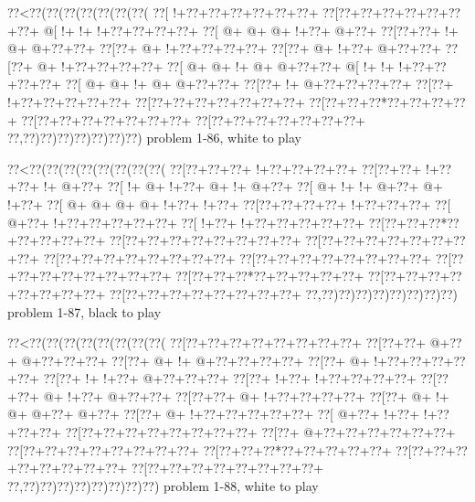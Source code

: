 \vbox{\vbox{\goo
\0??<\0??(\0??(\0??(\0??(\0??(\0??(\0??(
\0??[\- !+\0??+\0??+\0??+\0??+\0??+\0??+
\0??[\0??+\0??+\0??+\0??+\0??+\0??+\0??+
\- @[\- !+\- !+\- !+\0??+\0??+\0??+\0??+
\0??[\- @+\- @+\- @+\- !+\0??+\- @+\0??+
\0??[\0??+\0??+\- !+\- @+\- @+\0??+\0??+
\0??[\0??+\- @+\- !+\0??+\0??+\0??+\0??+
\0??[\0??+\- @+\- !+\0??+\- @+\0??+\0??+
\0??[\0??+\- @+\- !+\0??+\0??+\0??+\0??+
\0??[\- @+\- @+\- !+\- @+\- @+\0??+\0??+
\- @[\- !+\- !+\- !+\0??+\0??+\0??+\0??+
\0??[\- @+\- @+\- !+\- @+\- @+\0??+\0??+
\0??[\0??+\- !+\- @+\0??+\0??+\0??+\0??+
\0??[\0??+\- !+\0??+\0??+\0??+\0??+\0??+
\0??[\0??+\0??+\0??+\0??+\0??+\0??+\0??+
\0??[\0??+\0??+\0??*\0??+\0??+\0??+\0??+
\0??[\0??+\0??+\0??+\0??+\0??+\0??+\0??+
\0??[\0??+\0??+\0??+\0??+\0??+\0??+\0??+
\0??,\0??)\0??)\0??)\0??)\0??)\0??)\0??)
}
\hfil problem 1-86, white to play\hfil\break
}

\vbox{\vbox{\goo
\0??<\0??(\0??(\0??(\0??(\0??(\0??(\0??(\0??(
\0??[\0??+\0??+\0??+\- !+\0??+\0??+\0??+\0??+
\0??[\0??+\0??+\- !+\0??+\0??+\- !+\- @+\0??+
\0??[\- !+\- @+\- !+\0??+\- @+\- !+\- @+\0??+
\0??[\- @+\- !+\- !+\- @+\0??+\- @+\- !+\0??+
\0??[\- @+\- @+\- @+\- @+\- !+\0??+\- !+\0??+
\0??[\0??+\0??+\0??+\0??+\- !+\0??+\0??+\0??+
\0??[\- @+\0??+\- !+\0??+\0??+\0??+\0??+\0??+
\0??[\- !+\0??+\- !+\0??+\0??+\0??+\0??+\0??+
\0??[\0??+\0??+\0??*\0??+\0??+\0??+\0??+\0??+
\0??[\0??+\0??+\0??+\0??+\0??+\0??+\0??+\0??+
\0??[\0??+\0??+\0??+\0??+\0??+\0??+\0??+\0??+
\0??[\0??+\0??+\0??+\0??+\0??+\0??+\0??+\0??+
\0??[\0??+\0??+\0??+\0??+\0??+\0??+\0??+\0??+
\0??[\0??+\0??+\0??+\0??+\0??+\0??+\0??+\0??+
\0??[\0??+\0??+\0??*\0??+\0??+\0??+\0??+\0??+
\0??[\0??+\0??+\0??+\0??+\0??+\0??+\0??+\0??+
\0??[\0??+\0??+\0??+\0??+\0??+\0??+\0??+\0??+
\0??,\0??)\0??)\0??)\0??)\0??)\0??)\0??)\0??)
}
\hfil problem 1-87, black to play\hfil\break
}

\vbox{\vbox{\goo
\0??<\0??(\0??(\0??(\0??(\0??(\0??(\0??(\0??(
\0??[\0??+\0??+\0??+\0??+\0??+\0??+\0??+\0??+
\0??[\0??+\0??+\- @+\0??+\- @+\0??+\0??+\0??+
\0??[\0??+\- @+\- !+\- @+\0??+\0??+\0??+\0??+
\0??[\0??+\- @+\- !+\0??+\0??+\0??+\0??+\0??+
\0??[\0??+\- !+\- !+\0??+\- @+\0??+\0??+\0??+
\0??[\0??+\- !+\0??+\- !+\0??+\0??+\0??+\0??+
\0??[\0??+\0??+\- @+\- !+\0??+\- @+\0??+\0??+
\0??[\0??+\0??+\- @+\- !+\0??+\0??+\0??+\0??+
\0??[\0??+\- @+\- !+\- @+\- @+\0??+\- @+\0??+
\0??[\0??+\- @+\- !+\0??+\0??+\0??+\0??+\0??+
\0??[\- @+\0??+\- !+\0??+\- !+\0??+\0??+\0??+
\0??[\0??+\0??+\0??+\0??+\0??+\0??+\0??+\0??+
\0??[\0??+\- @+\0??+\0??+\0??+\0??+\0??+\0??+
\0??[\0??+\0??+\0??+\0??+\0??+\0??+\0??+\0??+
\0??[\0??+\0??+\0??*\0??+\0??+\0??+\0??+\0??+
\0??[\0??+\0??+\0??+\0??+\0??+\0??+\0??+\0??+
\0??[\0??+\0??+\0??+\0??+\0??+\0??+\0??+\0??+
\0??,\0??)\0??)\0??)\0??)\0??)\0??)\0??)\0??)
}
\hfil problem 1-88, white to play\hfil\break
}

